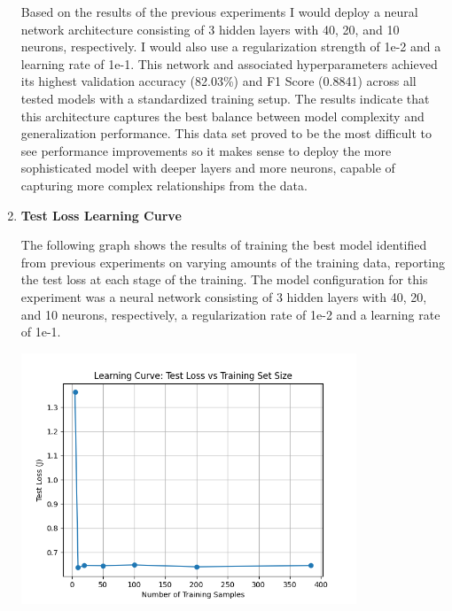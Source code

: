 \documentclass[letterpaper]{article}
\begin{document}
\begin{enumerate}
     Based on the results of the previous experiments I would deploy a neural network architecture consisting of 3 hidden layers with 40, 20, and 10 neurons, respectively. I would also use a regularization strength of 1e-2 and a learning rate of 1e-1. This network and associated hyperparameters achieved its highest validation accuracy (82.03\%) and F1 Score (0.8841) across all tested models with a standardized training setup. The results indicate that this architecture captures the best balance between model complexity and generalization performance. This data set proved to be the most difficult to see performance improvements so it makes sense to deploy the more sophisticated model with deeper layers and more neurons, capable of capturing more complex relationships from the data.
     

\item \textbf{Test Loss Learning Curve}

    The following graph shows the results of training the best model identified from previous experiments on varying amounts of the training data, reporting the test loss at each stage of the training. The model configuration for this experiment was a neural network consisting of 3 hidden layers with 40, 20, and 10 neurons, respectively, a regularization rate of 1e-2 and a learning rate of 1e-1.

     \vspace{0.2in}
        \begin{minipage}{\linewidth}
            \centering
            \includegraphics[width=10cm]{figures/loan_test_loss.png}
        \end{minipage}
        \vspace{0.1in}

\end{enumerate}
\end{document}
